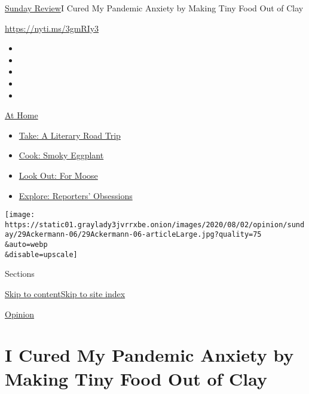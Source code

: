 \href{/section/opinion/sunday}{Sunday Review}\textbar{}I Cured My
Pandemic Anxiety by Making Tiny Food Out of Clay

\href{https://nyti.ms/3gmRIy3}{https://nyti.ms/3gmRIy3}

\begin{itemize}
\item
\item
\item
\item
\item
\end{itemize}

\href{https://www.nytimes3xbfgragh.onion/spotlight/at-home?action=click\&pgtype=Article\&state=default\&region=TOP_BANNER\&context=at_home_menu}{At
Home}

\begin{itemize}
\tightlist
\item
  \href{https://www.nytimes3xbfgragh.onion/2020/07/28/books/time-for-a-literary-road-trip.html?action=click\&pgtype=Article\&state=default\&region=TOP_BANNER\&context=at_home_menu}{Take:
  A Literary Road Trip}
\item
  \href{https://www.nytimes3xbfgragh.onion/2020/07/29/magazine/bored-with-your-home-cooking-some-smoky-eggplant-will-fix-that.html?action=click\&pgtype=Article\&state=default\&region=TOP_BANNER\&context=at_home_menu}{Cook:
  Smoky Eggplant}
\item
  \href{https://www.nytimes3xbfgragh.onion/2020/07/27/travel/moose-michigan-isle-royale.html?action=click\&pgtype=Article\&state=default\&region=TOP_BANNER\&context=at_home_menu}{Look
  Out: For Moose}
\item
  \href{https://www.nytimes3xbfgragh.onion/interactive/2020/at-home/even-more-reporters-editors-diaries-lists-recommendations.html?action=click\&pgtype=Article\&state=default\&region=TOP_BANNER\&context=at_home_menu}{Explore:
  Reporters' Obsessions}
\end{itemize}

\texttt{[image: https://static01.graylady3jvrrxbe.onion/images/2020/08/02/opinion/sunday/29Ackermann-06/29Ackermann-06-articleLarge.jpg?quality=75\\\&auto=webp\\\&disable=upscale]}

Sections

\protect\hyperlink{site-content}{Skip to
content}\protect\hyperlink{site-index}{Skip to site index}

\href{/section/opinion}{Opinion}

\hypertarget{i-cured-my-pandemic-anxiety-by-making-tiny-food-out-of-clay}{%
\section{I Cured My Pandemic Anxiety by Making Tiny Food Out of
Clay}\label{i-cured-my-pandemic-anxiety-by-making-tiny-food-out-of-clay}}


